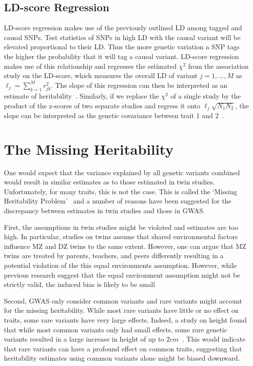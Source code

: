 \subsection{LD-score Regression}
\label{sub:ld_score_regression}

LD-score regression makes use of the previously outlined LD among tagged and causal SNPs.
Test statistics of SNPs in high LD with the causal variant will be elevated proportional to their LD\@.
Thus the more genetic variation a SNP tags the higher the probability that it will tag a causal variant.
LD-score regression makes use of this relationship and regresses the estimated $\chi^2$ from the association study on the LD-score, which measures the overall LD of variant $j = 1, \ldots, M$ as $\ell_j = \sum^M_{k=1} r^2_{jk}$. 
The slope of this regression can then be interpreted as an estimate of heritability~\cite{Bulik-Sullivan2015}.
Similarly, if we replace the $\chi^2$ of a single study by the product of the z-scores of two separate studies and regress it onto $\ell_j \sqrt{N_{1}N_{2}}$, the slope can be interpreted as the genetic covariance between trait 1 and 2~\cite{Bulik-Sullivan2015a}.

\section{The Missing Heritability}
\label{sec:missing_heritability}

One would expect that the variance explained by all genetic variants combined would result in similar estimates as to those estimated in twin studies.
Unfortunately, for many traits, this is not the case.
This is called the `Missing Heritability Problem'~\cite{Vineis2010} and a  number of reasons have been suggested for the discrepancy between estimates in twin studies and those in GWAS\@.

First, the assumptions in twin studies might be violated and estimates are too high.
In particular, studies on twins assume that shared environmental factors influence MZ and DZ twins to the same extent.
However, one can argue that MZ twins are treated by parents, teachers, and peers differently resulting in a potential violation of the this equal environments assumption. 
However, while previous research suggest that the equal environment assumption might not be strictly valid, the induced bias is likely to be small~\cite{Derks2006,Felson2014}

Second, GWAS only consider common variants and rare variants might account for the missing heritability.
While most rare variants have little or no effect on traits, some rare variants have very large effects.
Indeed, a study on height found that while most common variants only had small effects, some rare genetic variants resulted in a large increase in height of up to $2cm$~\cite{Marouli2017}.
This would indicate that rare variants can have a profound effect on common traits, suggesting that heritability estimates using common variants alone might be biased downward.

